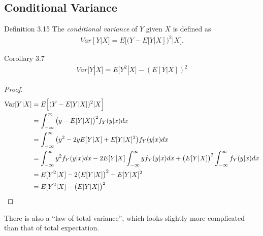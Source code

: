 \subsection{Conditional Variance}
\begin{boks}{Definition 3.15}
  The \textit{conditional variance} of $Y$ given $X$ is defined as
  \begin{align*}
    Var[Y|X] = E\Big[(Y - E[Y|X])^2|X\Big].
  \end{align*}
\end{boks}
%

\begin{boks}{Corollary 3.7}
  \begin{align*}
    Var[Y|X] = E\Big[Y^2|X\Big] - (E[Y|X])^2
  \end{align*}
\end{boks}

\begin{proof}
  \begin{align*}
    \operatorname{Var}[Y|X] &=
    E\Big[ (Y - E[Y|X])^2 | X \Big] \\ &=
    \int_{-\infty}^\infty \big(y - E[Y|X]\big)^2 f_Y(y|x) dx \\ &=
    \int_{-\infty}^\infty \big(y^2 - 2yE[Y|X] + E[Y|X]^2\big) f_Y(y|x) dx \\ &=
    \int_{-\infty}^\infty y^2 f_Y(y|x) dx -
    2E[Y|X]\int_{-\infty}^\infty y f_Y(y|x) dx +
    \big(E[Y|X]\big)^2 \int_{-\infty}^\infty f_Y(y|x) dx \\ &=
    E[Y^2|X] - 2\big(E[Y|X]\big)^2 + E[Y|X]^2 \\ &=
    E[Y^2|X] - \big(E[Y|X]\big)^2
  \end{align*}
\end{proof}

There is also a ``law of total variance'', which looks slightly more complicated than that of total expectation.

